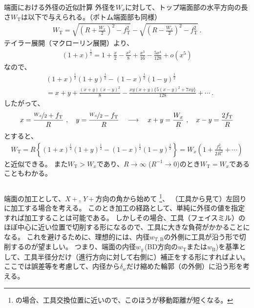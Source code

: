 \begin{Column}{端面における外径の近似計算}
外径を$W_x$に対して、トップ端面部の水平方向の長さ$W_\mathrm T$は以下で与えられる。（ボトム端面部も同様）
\begin{align*}
  W_\mathrm T
  = \sqrt{\left(R+\frac{W_x}2\right)^2-f_\mathrm T^2}
    -\sqrt{\left(R-\frac{W_x}2\right)^2-f_\mathrm T^2}\ .
\end{align*}
テイラー展開（マクローリン展開）より、
\begin{align*}
  (1+x)^\frac12 = 1+\frac x2-\frac{x^2}8+\frac{x^3}{16}-\frac{5x^4}{128}+o\left(x^5\right)
\end{align*}
なので、
\begin{align*}
  & (1+x)^\frac12(1+y)^\frac12-(1-x)^\frac12(1-y)^\frac12\\
  &= x+y+\frac{(x+y)(x-y)^2}8-\frac{xy(x+y)\big\{5(x-y)^2+7xy\big\}}{128}+\cdots\ .
\end{align*}
したがって、
\begin{align*}
  x = \frac{\nicefrac{W_x}2+f_\mathrm T}R\ ,\quad y = \frac{\nicefrac{W_x}2-f_\mathrm T}R\quad
  \longrightarrow \quad
  x+y = \frac{W_x}R\ , \quad x-y = \frac{2f_\mathrm T}R
\end{align*}
とすると、
\begin{align*}
  W_\mathrm T
  = R\left\{(1+x)^\frac12(1+y)^\frac12-(1-x)^\frac12(1-y)^\frac12\right\}
  = W_x\left(1+\frac{f_\mathrm T^2}{2R^2}+\cdots\right)
\end{align*}
と近似できる。
また$W_\mathrm T > W_x$であり、$R\to\infty$ ($R^{-1}\to0$)のとき$W_\mathrm T = W_x$であることもわかる。
\end{Column}



\clearpage
端面の加工として、$X+$, $Y+$方向の角から始めて
\footnote{\DMC の場合、工具交換位置に近いので、このほうが移動距離が短くなる。}、
（工具から見て）左回りに加工する場合を考える。
このとき加工の経路として、単純に外径の値を指定すれば加工することは可能である。
しかしその場合、工具（フェイスミル）のほぼ中心に近い位置で切削する形になるので、工具に大きな負荷がかかることになる。
これを避けるために、理想的には、内径$w_{\mathrm T, \mathrm B}$の外側に工具が沿う形で切削するのが望ましい。
つまり、端面の内径$w_y$\,(BD方向の$w_{\mathrm T}$または$w_{\mathrm B}$)を基準として、工具半径分だけ（進行方向に対して右側に）補正をする形にすればよい。
ここでは誤差等を考慮して、内径から$\delta_w$だけ縮めた輪郭（の外側）に沿う形を考える。



